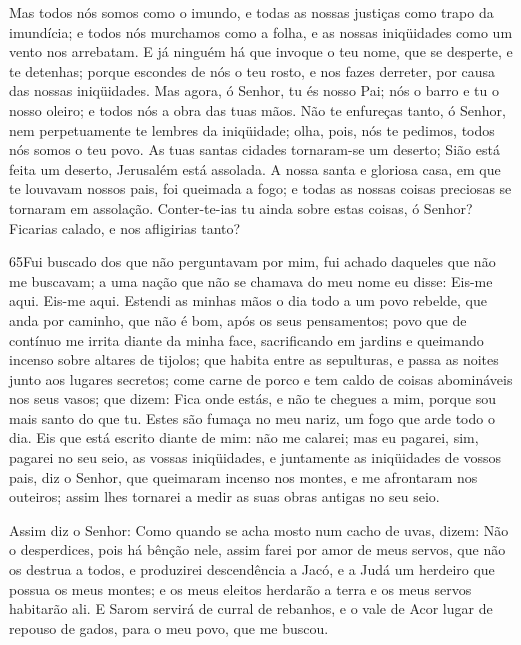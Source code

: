 Mas todos nós somos como o imundo, e todas as nossas justiças como
trapo da imundícia; e todos nós murchamos como a folha, e as nossas
iniqüidades como um vento nos arrebatam. E já ninguém há que
invoque o teu nome, que se desperte, e te detenhas; porque escondes
de nós o teu rosto, e nos fazes derreter, por causa das nossas
iniqüidades. Mas agora, ó Senhor, tu és nosso Pai; nós o barro e
tu o nosso oleiro; e todos nós a obra das tuas mãos. Não te
enfureças tanto, ó Senhor, nem perpetuamente te lembres da
iniqüidade; olha, pois, nós te pedimos, todos nós somos o teu povo.
As tuas santas cidades tornaram-se um deserto; Sião está
feita um deserto, Jerusalém está assolada. A nossa santa e
gloriosa casa, em que te louvavam nossos pais, foi queimada a fogo;
e todas as nossas coisas preciosas se tornaram em assolação.
Conter-te-ias tu ainda sobre estas coisas, ó Senhor? Ficarias
calado, e nos afligirias tanto?

\medskip

\lettrine{65}{}Fui buscado dos que não perguntavam por mim, fui
achado daqueles que não me buscavam; a uma nação que não se chamava
do meu nome eu disse: Eis-me aqui. Eis-me aqui. Estendi as
minhas mãos o dia todo a um povo rebelde, que anda por caminho, que
não é bom, após os seus pensamentos; povo que de contínuo me
irrita diante da minha face, sacrificando em jardins e queimando
incenso sobre altares de tijolos; que habita entre as
sepulturas, e passa as noites junto aos lugares secretos; come carne
de porco e tem caldo de coisas abomináveis nos seus vasos; que
dizem: Fica onde estás, e não te chegues a mim, porque sou mais
santo do que tu. Estes são fumaça no meu nariz, um fogo que arde
todo o dia. Eis que está escrito diante de mim: não me calarei;
mas eu pagarei, sim, pagarei no seu seio, as vossas iniqüidades,
e juntamente as iniqüidades de vossos pais, diz o Senhor, que
queimaram incenso nos montes, e me afrontaram nos outeiros; assim
lhes tornarei a medir as suas obras antigas no seu seio.

Assim diz o Senhor: Como quando se acha mosto num cacho de uvas,
dizem: Não o desperdices, pois há bênção nele, assim farei por amor
de meus servos, que não os destrua a todos, e produzirei
descendência a Jacó, e a Judá um herdeiro que possua os meus montes;
e os meus eleitos herdarão a terra e os meus servos habitarão ali.
E Sarom servirá de curral de rebanhos, e o vale de Acor lugar
de repouso de gados, para o meu povo, que me buscou.

